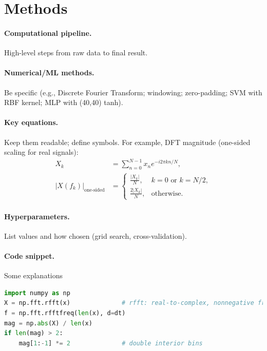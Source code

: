 \documentclass[reprint, superscriptaddress, aps]{revtex4-2}
\begin{document}
\section{Methods}

\paragraph*{Computational pipeline.} High-level steps from raw data to final result.

\paragraph*{Numerical/ML methods.} Be specific (e.g., Discrete Fourier Transform; windowing; zero-padding; SVM with RBF kernel; MLP with (40,40) tanh).

\paragraph*{Key equations.} Keep them readable; define symbols. For example, DFT magnitude (one-sided scaling for real signals):
\begin{equation}
\begin{aligned}
X_k &= \sum_{n=0}^{N-1} x_n e^{-i 2\pi kn / N}, \\
|X(f_k)|_{\text{one-sided}} &=
\begin{cases}
\frac{|X_k|}{N},  & k=0 \text{ or } k=N/2,\\
\frac{2|X_k|}{N}, & \text{otherwise}.
\end{cases}
\end{aligned}
\end{equation}

\paragraph*{Hyperparameters.} List values and how chosen (grid search, cross-validation).

\paragraph*{Code snippet.}
Some explanations

\begin{lstlisting}[language=Python, caption={Example: one-sided FFT magnitude in NumPy}]
import numpy as np
X = np.fft.rfft(x)              # rfft: real-to-complex, nonnegative freqs
f = np.fft.rfftfreq(len(x), d=dt)
mag = np.abs(X) / len(x)
if len(mag) > 2:
    mag[1:-1] *= 2              # double interior bins
\end{lstlisting}
\end{document}
